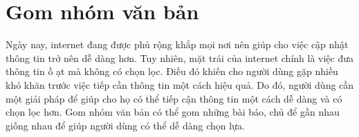 

%

\section{Gom nhóm văn bản}
Ngày nay, internet đang được phủ rộng khắp mọi nơi nên giúp cho việc cập nhật thông tin trở nên dễ dàng hơn.
Tuy nhiên, mặt trái của internet chính là việc đưa thông tin ồ ạt mà không có chọn lọc.
Điều đó khiến cho người dùng gặp nhiều khó khăn trước việc tiếp cần thông tin một cách hiệu quả.
Do đó, người dùng cần một giải pháp để giúp cho họ có thể tiếp cận thông tin một cách dễ dàng và có chọn lọc hơn.
Gom nhóm văn bản có thể gom những bài báo, chủ để gần nhau giống nhau để giúp người dùng có thể dễ dàng chọn lựa.

